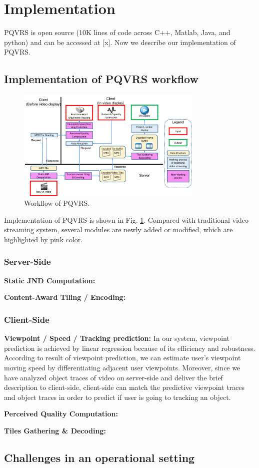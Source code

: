 \section{Implementation}

PQVRS is open source (10K lines of code across C++, Matlab, Java, and python) and can be accessed at [x]. Now we describe our implementation of PQVRS.

\subsection{Implementation of PQVRS workflow}

\begin{figure}
  \centering
  \includegraphics[width=3.5in]{images/implementation.pdf}
  \caption{Workflow of PQVRS.}
  \label{implementation}
  \end{figure}

Implementation of PQVRS is shown in Fig. \ref{implementation}. Compared with traditional video streaming system, several modules are newly added or modified, which are highlighted by pink color.

\subsubsection{Server-Side}

\textbf{Static JND Computation:}

\textbf{Content-Award Tiling / Encoding:}

\subsubsection{Client-Side}

\textbf{Viewpoint / Speed / Tracking prediction:} In our system, viewpoint prediction is achieved by linear regression because of its efficiency and robustness. According to result of viewpoint prediction, we can estimate user's viewpoint moving speed by differentiating adjacent user viewpoints. Moreover, since we have analyzed object traces of video on server-side and deliver the brief description to client-side, client-side can match the predictive viewpoint traces and object traces in order to predict if user is going to tracking an object.

\textbf{Perceived Quality Computation:}

\textbf{Tiles Gathering \& Decoding:}

\subsection{Challenges in an operational setting}

